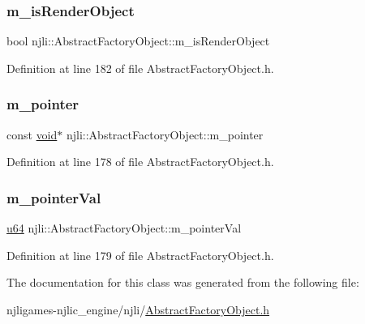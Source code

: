 \subsubsection{\texorpdfstring{m\+\_\+is\+Render\+Object}{m\_isRenderObject}}
{\footnotesize\ttfamily bool njli\+::\+Abstract\+Factory\+Object\+::m\+\_\+is\+Render\+Object\hspace{0.3cm}{\ttfamily [private]}}



Definition at line 182 of file Abstract\+Factory\+Object.\+h.

\mbox{\label{classnjli_1_1_abstract_factory_object_a8eea2673c37f55c871de8a808a1a0b94}} 
\subsubsection{\texorpdfstring{m\+\_\+pointer}{m\_pointer}}
{\footnotesize\ttfamily const \mbox{\hyperlink{_thread_8h_af1e856da2e658414cb2456cb6f7ebc66}{void}}$\ast$ njli\+::\+Abstract\+Factory\+Object\+::m\+\_\+pointer}



Definition at line 178 of file Abstract\+Factory\+Object.\+h.

\mbox{\label{classnjli_1_1_abstract_factory_object_af1a3dd67b0ce2fc70cff9ca111263829}} 
\subsubsection{\texorpdfstring{m\+\_\+pointer\+Val}{m\_pointerVal}}
{\footnotesize\ttfamily \mbox{\hyperlink{_util_8h_ad758b7a5c3f18ed79d2fcd23d9f16357}{u64}} njli\+::\+Abstract\+Factory\+Object\+::m\+\_\+pointer\+Val}



Definition at line 179 of file Abstract\+Factory\+Object.\+h.



The documentation for this class was generated from the following file\+:\begin{DoxyCompactItemize}
\item 
njligames-\/njlic\+\_\+engine/njli/\mbox{\hyperlink{_abstract_factory_object_8h}{Abstract\+Factory\+Object.\+h}}\end{DoxyCompactItemize}
